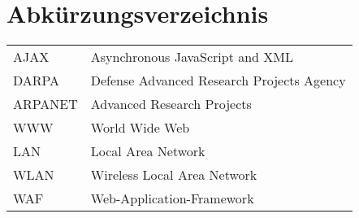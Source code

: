 \section*{Abkürzungsverzeichnis}

\begin{tabularx}{0.9\columnwidth}{lX}
	AJAX & Asynchronous JavaScript and XML \\
	DARPA & Defense Advanced Research Projects Agency\\
	ARPANET & Advanced Research Projects\\
	WWW & World Wide Web \\
	LAN & Local Area Network \\
	WLAN & Wireless Local Area Network \\
	WAF & Web-Application-Framework \\
\end{tabularx}



	
%
